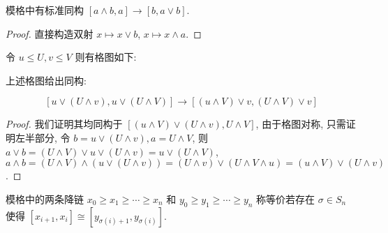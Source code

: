 \begin{lemma}
    模格中有标准同构 \([a \wedge b,a] \to [b,a \vee b]\).

    \begin{proof}
        直接构造双射 \(x \mapsto x \vee b\), \(x \mapsto x \wedge a\).
    \end{proof}
\end{lemma}

\begin{lemma}[Zassenhaus 引理]
    \label {lemma:Zassenhaus lemma}
    令 \(u \leq U,v \leq V\) 则有格图如下:

    \begin{center}
    \end{center}

    上述格图给出同构:

    \[
        [u \vee (U \wedge v), u \vee (U \wedge V)] \to [(u \wedge V) \vee v, (U \wedge V) \vee v]
    \]

    \begin{proof}
        我们证明其均同构于 \([(u \wedge V) \vee (U \wedge v),U \wedge V]\), 由于格图对称, 只需证明左半部分, 令 \(b = u \vee (U \wedge v), a = U \wedge V\), 
        则 \(a \vee b = (U \wedge V) \vee u \vee (U \wedge v) = u \vee (U \wedge V)\), \(a \wedge b = (U \wedge V) \wedge (u \vee (U \wedge v)) = (U \wedge v) \vee (U \wedge V \wedge u) = (u \wedge V) \vee (U \wedge v)\).
    \end{proof}
\end{lemma}

\begin{definition}
    模格中的两条降链 \(x_0 \geq x_1 \geq \cdots \geq x_n\) 和 \(y_0 \geq y_1 \geq \cdots \geq y_n\) 称等价若存在 \(\sigma \in S_{n}\) 使得 \([x_{i+1},x_i] \cong [y_{\sigma (i) + 1},y_{\sigma (i)}]\).
\end{definition}


